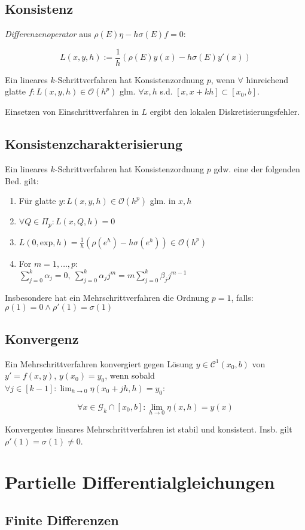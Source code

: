 \subsection*{Konsistenz}

\emph{Differenzenoperator} aus $\rho(E)\eta - h\sigma(E)f = 0$:

$$L(x,y,h) := \frac{1}{h}\left(\rho(E)y(x) - h\sigma(E)y'(x)\right)$$

Ein lineares $k$-Schrittverfahren hat Konsistenzordnung $p$, wenn $\forall$ hinreichend glatte $f : L(x,y,h) \in \mathcal{O}(h^p)$ glm. $\forall x, h$ s.d. $[x,x+kh] \subset [x_0,b]$.

\spacing

Einsetzen von Einschrittverfahren in $L$ ergibt den lokalen Diskretisierungsfehler.

\subsection*{Konsistenzcharakterisierung}

Ein lineares $k$-Schrittverfahren hat Konsistenzordnung $p$ gdw. eine der folgenden Bed. gilt:

\begin{enumerate}[label=(\alph*)]
	\item Für glatte $y: L(x,y,h) \in \mathcal{O}(h^p)$ glm. in $x, h$
	\item $\forall Q \in \Pi_p : L(x,Q,h) = 0$
	\item $L(0,\text{exp},h) = \frac{1}{h}(\rho(e^h)-h\sigma(e^h)) \in \mathcal{O}(h^p)$
	\item For $m = 1, \dots, p$: \\ $\sum_{j=0}^k \alpha_j = 0, \ \sum_{j=0}^k \alpha_j j^m = m \sum_{j=0}^k \beta_j j^{m-1}$
\end{enumerate}

Insbesondere hat ein Mehrschrittverfahren die Ordnung $p=1$, falls: $\rho(1) = 0 \land \rho'(1) = \sigma(1)$

\subsection*{Konvergenz}

Ein Mehrschrittverfahren konvergiert gegen Lösung $y \in \mathcal{C}^1(x_0,b)$ von $y'=f(x,y)$, $y(x_0)=y_0$, wenn sobald $\forall j \in [k-1] : \lim_{h \to 0} \eta(x_0+jh,h)=y_0$:

$$\forall x \in \mathcal{G}_k \cap [x_0,b] : \lim_{h \to 0} \eta(x,h) = y(x)$$

Konvergentes lineares Mehrschrittverfahren ist stabil und konsistent. Insb. gilt $\rho'(1)=\sigma(1) \neq 0$.

\section*{Partielle Differentialgleichungen}

\subsection*{Finite Differenzen}
